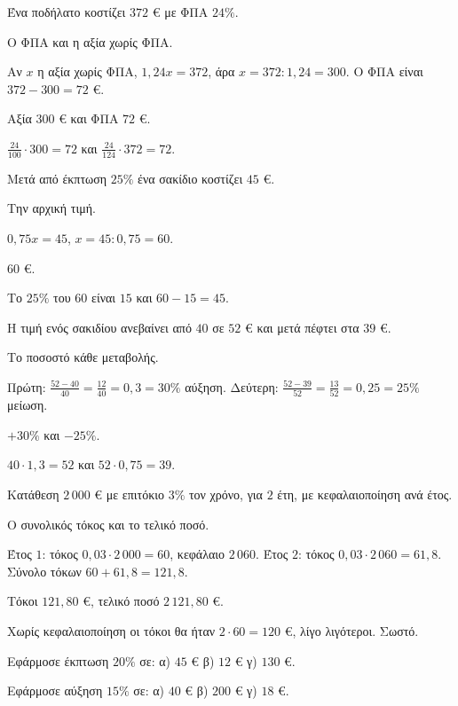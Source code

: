 \tixero Ένα ποδήλατο κοστίζει $372$ € με ΦΠΑ $24\%$.\par
\tithelo Ο ΦΠΑ και η αξία χωρίς ΦΠΑ.\par
\possindeo Αν $x$ η αξία χωρίς ΦΠΑ, $1{,}24x=372$, άρα $x=372:1{,}24=300$. Ο ΦΠΑ είναι $372-300=72$ €.\par
\apantisi Αξία $300$ € και ΦΠΑ $72$ €.\par
\elegxos $\frac{24}{100}\cdot300=72$ και $\frac{24}{124}\cdot372=72$.

\tixero Μετά από έκπτωση $25\%$ ένα σακίδιο κοστίζει $45$ €.\par
\tithelo Την αρχική τιμή.\par
\possindeo $0{,}75x=45$, $x=45:0{,}75=60$.\par
\apantisi $60$ €.\par
\elegxos Το $25\%$ του $60$ είναι $15$ και $60-15=45$.

\tixero Η τιμή ενός σακιδίου ανεβαίνει από $40$ σε $52$ € και μετά πέφτει στα $39$ €.\par
\tithelo Το ποσοστό κάθε μεταβολής.\par
\possindeo Πρώτη: $\frac{52-40}{40}=\frac{12}{40}=0{,}3=30\%$ αύξηση. Δεύτερη: $\frac{52-39}{52}=\frac{13}{52}=0{,}25=25\%$ μείωση.\par
\apantisi $+30\%$ και $-25\%$.\par
\elegxos $40\cdot1{,}3=52$ και $52\cdot0{,}75=39$.

\tixero Κατάθεση $2\,000$ € με επιτόκιο $3\%$ τον χρόνο, για $2$ έτη, με κεφαλαιοποίηση ανά έτος.\par
\tithelo Ο συνολικός τόκος και το τελικό ποσό.\par
\possindeo Έτος $1$: τόκος $0{,}03\cdot2\,000=60$, κεφάλαιο $2\,060$. Έτος $2$: τόκος $0{,}03\cdot2\,060=61{,}8$. Σύνολο τόκων $60+61{,}8=121{,}8$.\par
\apantisi Τόκοι $121{,}80$ €, τελικό ποσό $2\,121{,}80$ €.\par
\elegxos Χωρίς κεφαλαιοποίηση οι τόκοι θα ήταν $2\cdot60=120$ €, λίγο λιγότεροι. Σωστό.



\ex Εφάρμοσε έκπτωση $20\%$ σε: α) $45$ € \quad β) $12$ € \quad γ) $130$ €.

\ex Εφάρμοσε αύξηση $15\%$ σε: α) $40$ € \quad β) $200$ € \quad γ) $18$ €.

